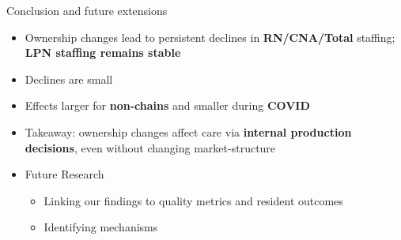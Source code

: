 \documentclass{beamer}
\begin{document}

	
	

	
	

\begin{frame}[t]{Conclusion and future extensions}

\begin{itemize}[<+->]
	\setlength{\itemsep}{0.85em}
	\item Ownership changes lead to persistent declines in \textbf{RN/CNA/Total} staffing; \textbf{LPN staffing remains stable}
	\item Declines are small
	\item Effects larger for \textbf{non-chains} and smaller during \textbf{COVID}
	\item Takeaway: ownership changes affect care via \textbf{internal production decisions}, even without changing market-structure 
	\item Future Research
	
	\begin{itemize}
		\vspace{0.25em}
		\setlength{\itemsep}{0.5em}
		\item Linking our findings to quality metrics and resident outcomes
		\item Identifying mechanisms
	\end{itemize}
  
\end{itemize}
\end{frame}
\end{document}
